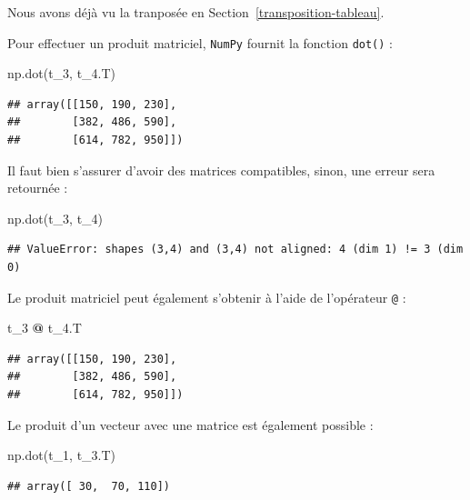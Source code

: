 \documentclass[
  12pt,
]{book}
\newenvironment{Shaded}{\begin{snugshade}}{\end{snugshade}}
\newcommand{\NormalTok}[1]{#1}
\newcommand{\OperatorTok}[1]{\textcolor[rgb]{0.81,0.36,0.00}{\textbf{#1}}}
\numberwithin{equation}{section}
\numberwithin{countremarque}{section}
\begin{document}
Nous avons déjà vu la tranposée en Section~\ref{transposition-tableau}.

Pour effectuer un produit matriciel, \texttt{NumPy} fournit la fonction \texttt{dot()} :

\begin{Shaded}
\begin{Highlighting}[]
\NormalTok{np.dot(t\_3, t\_4.T)}
\end{Highlighting}
\end{Shaded}

\begin{lstlisting}
## array([[150, 190, 230],
##        [382, 486, 590],
##        [614, 782, 950]])
\end{lstlisting}

Il faut bien s'assurer d'avoir des matrices compatibles, sinon, une erreur sera retournée :

\begin{Shaded}
\begin{Highlighting}[]
\NormalTok{np.dot(t\_3, t\_4)}
\end{Highlighting}
\end{Shaded}

\begin{lstlisting}
## ValueError: shapes (3,4) and (3,4) not aligned: 4 (dim 1) != 3 (dim 0)
\end{lstlisting}

Le produit matriciel peut également s'obtenir à l'aide de l'opérateur \texttt{@} :

\begin{Shaded}
\begin{Highlighting}[]
\NormalTok{t\_3 }\OperatorTok{@}\NormalTok{ t\_4.T}
\end{Highlighting}
\end{Shaded}

\begin{lstlisting}
## array([[150, 190, 230],
##        [382, 486, 590],
##        [614, 782, 950]])
\end{lstlisting}

Le produit d'un vecteur avec une matrice est également possible :

\begin{Shaded}
\begin{Highlighting}[]
\NormalTok{np.dot(t\_1, t\_3.T)}
\end{Highlighting}
\end{Shaded}

\begin{lstlisting}
## array([ 30,  70, 110])
\end{lstlisting}
\end{document}
